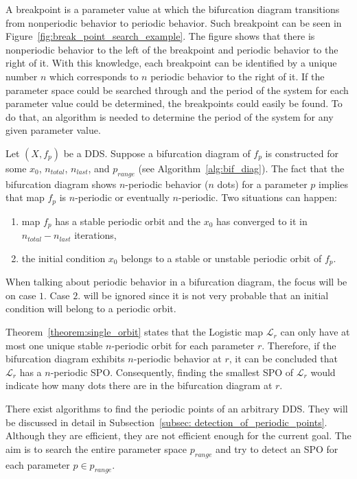 A breakpoint is a parameter value at which the bifurcation diagram transitions from nonperiodic behavior to periodic behavior.
Such breakpoint can be seen in Figure~\ref{fig:break_point_search_example}.
The figure shows that there is nonperiodic behavior to the left of the breakpoint and periodic behavior to the right of it.
With this knowledge, each breakpoint can be identified by a unique number $n$ which corresponds to $n$ periodic behavior to the right of it.
If the parameter space could be searched through and the period of the system for each parameter value could be determined, the breakpoints could easily be found.
To do that, an algorithm is needed to determine the period of the system for any given parameter value.
\par
Let $(X, f_{p})$ be a DDS. Suppose a bifurcation diagram of $f_{p}$ is constructed for some $x_0$, $n_{total}$, $n_{last}$, and $p_{range}$ (see Algorithm~\ref{alg:bif_diag}).
The fact that the bifurcation diagram shows $n$-periodic behavior ($n$ dots) for a parameter $p$ implies that map $f_{p}$ is $n$-periodic or eventually $n$-periodic.
Two situations can happen:
\begin{enumerate}
    \item map $f_{p}$ has a stable periodic orbit and the $x_0$ has converged to it in $n_{total}-n_{last}$ iterations,
    \item the initial condition $x_0$ belongs to a stable or unstable periodic orbit of $f_p$.
\end{enumerate}
When talking about periodic behavior in a bifurcation diagram, the focus will be on case $1$.
Case $2$. will be ignored since it is not very probable that an initial condition will belong to a periodic orbit.
\par
Theorem~\ref{theorem:single_orbit} states that the Logistic map $\mathcal{L}_r$ can only have at most one unique stable $n$-periodic orbit for each parameter $r$.
Therefore, if the bifurcation diagram exhibits $n$-periodic behavior at $r$, it can be concluded that $\mathcal{L}_{r}$ has a $n$-periodic SPO.
Consequently, finding the smallest SPO of $\mathcal{L}_{r}$ would indicate how many dots there are in the bifurcation diagram at $r$.
\par
There exist algorithms to find the periodic points of an arbitrary DDS.
They will be discussed in detail in Subsection~\ref{subsec: detection_of_periodic_points}.
Although they are efficient, they are not efficient enough for the current goal.
The aim is to search the entire parameter space $p_{range}$ and try to detect an SPO for each parameter $p \in p_{range}$.
